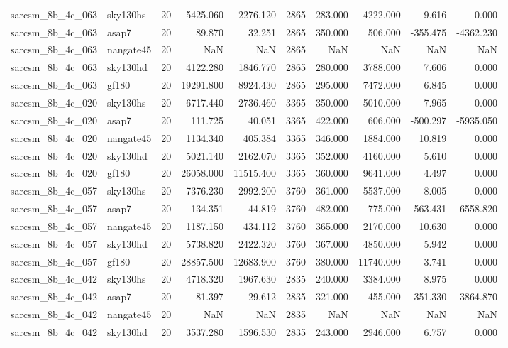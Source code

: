 \begin{tabular}{llrrrrrrrr}
sarcsm\_8b\_4c\_063 & sky130hs & 20 & 5425.060 & 2276.120 & 2865 & 283.000 & 4222.000 & 9.616 & 0.000 \\
sarcsm\_8b\_4c\_063 & asap7 & 20 & 89.870 & 32.251 & 2865 & 350.000 & 506.000 & -355.475 & -4362.230 \\
sarcsm\_8b\_4c\_063 & nangate45 & 20 & NaN & NaN & 2865 & NaN & NaN & NaN & NaN \\
sarcsm\_8b\_4c\_063 & sky130hd & 20 & 4122.280 & 1846.770 & 2865 & 280.000 & 3788.000 & 7.606 & 0.000 \\
sarcsm\_8b\_4c\_063 & gf180 & 20 & 19291.800 & 8924.430 & 2865 & 295.000 & 7472.000 & 6.845 & 0.000 \\
sarcsm\_8b\_4c\_020 & sky130hs & 20 & 6717.440 & 2736.460 & 3365 & 350.000 & 5010.000 & 7.965 & 0.000 \\
sarcsm\_8b\_4c\_020 & asap7 & 20 & 111.725 & 40.051 & 3365 & 422.000 & 606.000 & -500.297 & -5935.050 \\
sarcsm\_8b\_4c\_020 & nangate45 & 20 & 1134.340 & 405.384 & 3365 & 346.000 & 1884.000 & 10.819 & 0.000 \\
sarcsm\_8b\_4c\_020 & sky130hd & 20 & 5021.140 & 2162.070 & 3365 & 352.000 & 4160.000 & 5.610 & 0.000 \\
sarcsm\_8b\_4c\_020 & gf180 & 20 & 26058.000 & 11515.400 & 3365 & 360.000 & 9641.000 & 4.497 & 0.000 \\
sarcsm\_8b\_4c\_057 & sky130hs & 20 & 7376.230 & 2992.200 & 3760 & 361.000 & 5537.000 & 8.005 & 0.000 \\
sarcsm\_8b\_4c\_057 & asap7 & 20 & 134.351 & 44.819 & 3760 & 482.000 & 775.000 & -563.431 & -6558.820 \\
sarcsm\_8b\_4c\_057 & nangate45 & 20 & 1187.150 & 434.112 & 3760 & 365.000 & 2170.000 & 10.630 & 0.000 \\
sarcsm\_8b\_4c\_057 & sky130hd & 20 & 5738.820 & 2422.320 & 3760 & 367.000 & 4850.000 & 5.942 & 0.000 \\
sarcsm\_8b\_4c\_057 & gf180 & 20 & 28857.500 & 12683.900 & 3760 & 380.000 & 11740.000 & 3.741 & 0.000 \\
sarcsm\_8b\_4c\_042 & sky130hs & 20 & 4718.320 & 1967.630 & 2835 & 240.000 & 3384.000 & 8.975 & 0.000 \\
sarcsm\_8b\_4c\_042 & asap7 & 20 & 81.397 & 29.612 & 2835 & 321.000 & 455.000 & -351.330 & -3864.870 \\
sarcsm\_8b\_4c\_042 & nangate45 & 20 & NaN & NaN & 2835 & NaN & NaN & NaN & NaN \\
sarcsm\_8b\_4c\_042 & sky130hd & 20 & 3537.280 & 1596.530 & 2835 & 243.000 & 2946.000 & 6.757 & 0.000 \\

\end{tabular}
